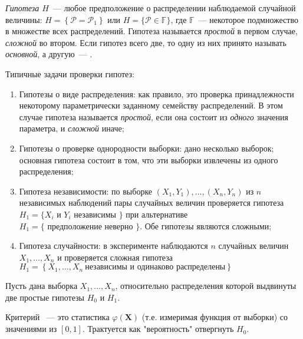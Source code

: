 \begin{defn}
{\it Гипотеза $H$}~--- любое предположение о распределении наблюдаемой случайной величины: $H=\left\{\mathcal{P}=\mathcal{P}_{1}\right\}$ или $H=\{\mathcal{P} \in \mathbb{F}\}$, где $\mathbb{F}$~--- некоторое подмножество в множестве всех распределений. Гипотеза называется {\it простой} в первом случае, {\it сложной} во втором. Если гипотез всего две, то одну из них принято называть {\it основной}, а другую~--- {}.
\end{defn}

\begin{rmrk} Типичные задачи проверки гипотез:
\begin{enumerate}
    \item Гипотезы о виде распределения: как правило, это проверка принадлежности некоторому параметрически заданному семейству распределений. В этом случае гипотеза называется {\it простой}, если она состоит из {\it одного} значения параметра, и {\it сложной} иначе;
    \item Гипотезы о проверке однородности выборки: дано несколько выборок; основная гипотеза состоит в том, что эти выборки извлечены из одного распределения;
    \item Гипотеза независимости: по выборке $(X_1,Y_1), \ldots, (X_n,Y_n)$ из $n$ независимых наблюдений пары случайных величин проверяется гипотеза $H_{1}=\{X_{i} \text { и } Y_{i} \text { независимы }\}$ при альтернативе $H_{1}=\{ \text { предположение неверно } \}$. Обе гипотезы являются сложными;
    \item Гипотеза случайности: в эксперименте наблюдаются $n$ случайных величин $X_{1}, \ldots, X_{n}$ и проверяется сложная гипотеза $H_{1}=\left\{X_{1}, \ldots, X_{n}~ \text{независимы и одинаково распределены}\right\}$
\end{enumerate}
\end{rmrk}

Пусть дана выборка $X_{1}, \ldots, X_{n}$, относительно распределения которой выдвинуты две простые гипотезы $H_{0}$ и $H_1$.
\begin{defn}
    Критерий ~--- это статистика $\varphi(\mathbf{X})$ (т.е. измеримая функция от выборки) со значениями из $[0, 1]$. Трактуется как "вероятность" отвергнуть $H_0$.
\end{defn}


